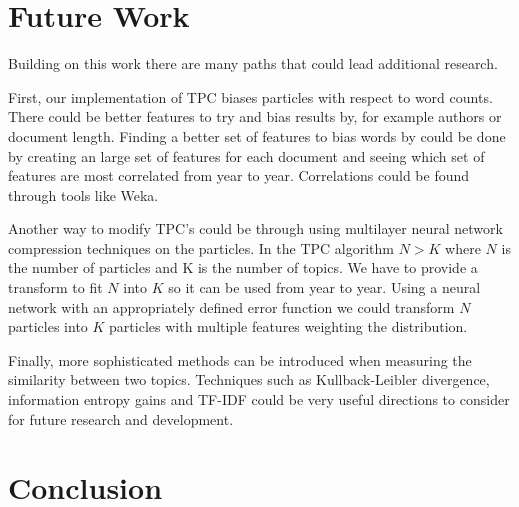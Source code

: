 \documentclass[conference]{IEEEtran}
\begin{document}
\section{Future Work}
Building on this work there are many paths that could lead additional research.

First, our implementation of TPC biases particles with respect to word counts. There could be better features to try and bias results by, for example authors or document length. Finding a better set of features to bias words by could be done by creating an large set of features for each document and seeing which set of features are most correlated from year to year. Correlations could be found through tools like Weka. 

Another way to modify TPC's could be through using multilayer neural network compression techniques on the particles. In the TPC algorithm $N>K$ where $N$ is the number of particles and K is the number of topics. We have to provide a transform to fit $N$ into $K$ so it can be used from year to year. Using a neural network with an appropriately defined error function we could transform $N$ particles into $K$ particles with multiple features weighting the distribution.

Finally, more sophisticated methods can be introduced when measuring the similarity between two topics. Techniques such as Kullback-Leibler divergence, information entropy gains and TF-IDF could be very useful directions to consider for future research and development. 

\section{Conclusion}
\end{document}
